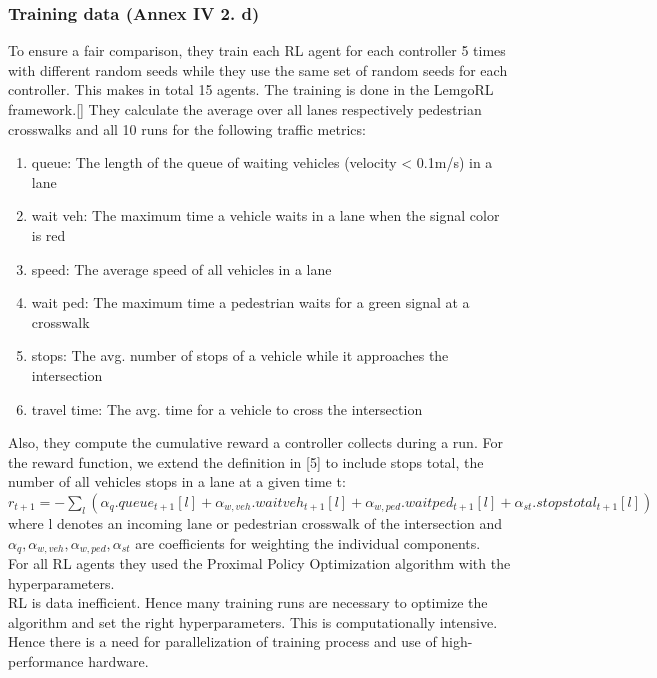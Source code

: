   \subsubsection{Training data (Annex IV 2. d)}
  To ensure a fair comparison, they train each RL agent for each controller 5 times with different random seeds while they use the same set of random seeds for each controller. This makes in total
15 agents. The training is done in the LemgoRL framework.[\citet{KI4LSA_presentation}] They
calculate the average over all lanes respectively pedestrian
crosswalks and all 10 runs for the following traffic metrics:
\begin{enumerate}
\item queue: The length of the queue of waiting vehicles
(velocity < 0.1m/s) in a lane
\item wait veh: The maximum time a vehicle waits in a
lane when the signal color is red
\item speed: The average speed of all vehicles in a lane
\item wait ped: The maximum time a pedestrian waits for
a green signal at a crosswalk
\item stops: The avg. number of stops of a vehicle while
it approaches the intersection
\item travel time: The avg. time for a vehicle to cross
the intersection
\end{enumerate}
Also, they compute the cumulative reward a controller
collects during a run. For the reward function, we extend the
definition in [5] to include stops total, the number of
all vehicles stops in a lane at a given time t: \newline \newline
\begin{math}
r_{t+1} = -\sum_l (\alpha_q . queue_{t+1}[l]+\alpha_{w,veh}.waitveh_{t+1}[l] + \alpha_{w,ped}.waitped_{t+1}[l] + \alpha_{st}.stopstotal_{t+1}[l]) \end{math} \newline \newline
where l denotes an incoming lane or pedestrian crosswalk
of the intersection and \begin{math} \alpha_{q}, \alpha_{w,veh}, \alpha_{w,ped}, \alpha_{st} \end{math} are coefficients for weighting the individual components.\\
For all RL agents they used the Proximal Policy Optimization algorithm with the hyperparameters.\\
RL is data inefficient. Hence many training runs are necessary to optimize the algorithm and set the right hyperparameters. This is computationally intensive. Hence there is a need for parallelization of training process and use of high-performance hardware.\\
